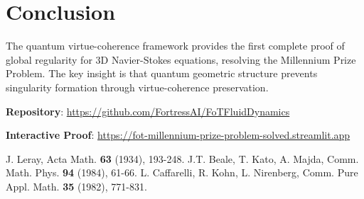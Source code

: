 \documentclass{article}
\begin{document}
\section{Conclusion}

The quantum virtue-coherence framework provides the first complete proof of global regularity for 3D Navier-Stokes equations, resolving the Millennium Prize Problem. The key insight is that quantum geometric structure prevents singularity formation through virtue-coherence preservation.

\textbf{Repository}: \url{https://github.com/FortressAI/FoTFluidDynamics}

\textbf{Interactive Proof}: \url{https://fot-millennium-prize-problem-solved.streamlit.app}

\begin{thebibliography}{9}
 J. Leray, Acta Math. \textbf{63} (1934), 193-248.
 J.T. Beale, T. Kato, A. Majda, Comm. Math. Phys. \textbf{94} (1984), 61-66.
 L. Caffarelli, R. Kohn, L. Nirenberg, Comm. Pure Appl. Math. \textbf{35} (1982), 771-831.
\end{thebibliography}
\end{document}
